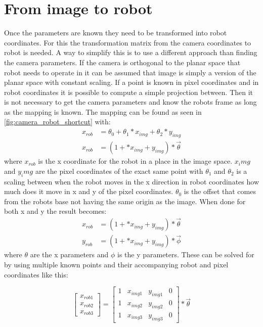 \section{From image to robot}
Once the parameters are known they need to be transformed into robot coordinates. For this the transformation matrix from the camera coordinates to robot is needed. A way to simplify this is to use a different approach than finding the camera parameters. If the camera is orthogonal to the planar space that robot needs to operate in it can be assumed that image is simply a version of the planar space with constant scaling. If a point is known in pixel coordinates and in robot coordinates it is possible to compute a simple projection between. Then it is not necessary to get the camera parameters and know the robots frame as long as the mapping is known. The mapping can be found as seen in \autoref{fig:camera_robot_shortcut} with:
\begin{equation}
\begin{split}
x_{rob}&=\theta_{0}+\theta_{1}*x_{img}+\theta_{2}*y_{img}\\
x_{rob}&=(1+*x_{img}+y_{img}) * \vec{\theta}
\end{split}
\end{equation}
 where $x_{rob}$ is the x coordinate for the robot in a place in the image space. $x_img$ and $y_img$ are the pixel coordinates of the exact same point with $\theta_1$ and $\theta_2$ is a scaling between when the robot moves in the x direction in robot coordinates how much does it move in x and y of the pixel coordinates. $\theta_0$ is the offset that comes from the robots base not having the same origin as the image. When done for both x and y the result becomes:
\begin{equation}
\begin{split}
x_{rob}&=(1+*x_{img}+y_{img})*\vec{\theta}\\
y_{rob}&=(1+*x_{img}+y_{img}) * \vec{\phi}
\end{split}
\end{equation}
where $\theta$ are the x parameters and $\phi$ is the y parameters. These can be solved for by using multiple known points and their accompanying robot and pixel coordinates like this:

\begin{equation}
\begin{bmatrix}
x_{rob1} \\
x_{rob2} \\
x_{rob3}
\end{bmatrix} 
 =
\begin{bmatrix}
1 & x_{img1} & y_{img1} & 0 \\
1 & x_{img2} & y_{img2} & 0 \\
1 & x_{img3} & y_{img3} & 0 
\end{bmatrix}  
* \vec{\theta}
\end{equation}

